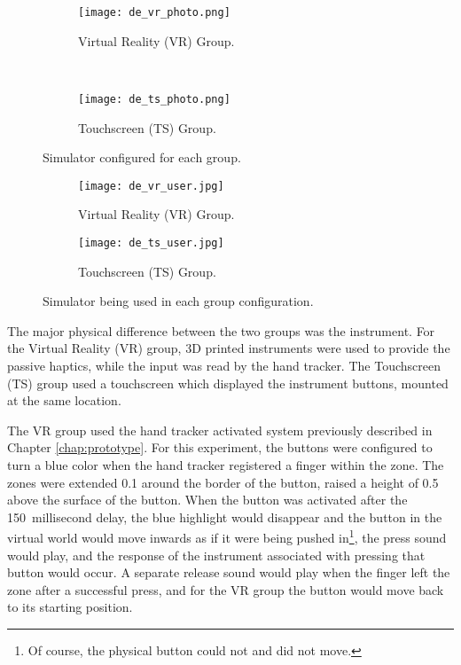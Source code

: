 \begin{figure}
    \centering
    \begin{subfigure}[t]{0.95\linewidth}
        \centering
        \texttt{[image: de\_vr\_photo.png]}
        \caption{Virtual Reality (VR) Group.}
        \label{fig:de_simgroups:vr}
    \end{subfigure}\\
    \begin{subfigure}[t]{0.95\linewidth}
        \centering
        \texttt{[image: de\_ts\_photo.png]}
        \caption{Touchscreen (TS) Group.}
        \label{fig:de_simgroups:ts}
    \end{subfigure}
    \caption{Simulator configured for each group.}
    \label{fig:de_simgroups}
\end{figure}

\begin{figure}
    \centering
    \begin{subfigure}[t]{0.95\linewidth}
        \centering
        \texttt{[image: de\_vr\_user.jpg]}
        \caption{Virtual Reality (VR) Group.}
        \label{fig:de_userpic:vr}
    \end{subfigure}
    \begin{subfigure}[t]{0.95\linewidth}
        \centering
        \texttt{[image: de\_ts\_user.jpg]}
        \caption{Touchscreen (TS) Group.}
        \label{fig:de_userpic:ts}
    \end{subfigure}
    \caption{Simulator being used in each group configuration.}
    \label{fig:de_userpic}
\end{figure}

The major physical difference between the two groups was the instrument.
For the Virtual Reality (VR) group, 3D printed instruments were used to provide the passive haptics, while the input was read by the hand tracker.
The Touchscreen (TS) group used a touchscreen which displayed the instrument buttons, mounted at the same location.

The VR group used the hand tracker activated system previously described in Chapter \ref{chap:prototype}.
For this experiment, the buttons were configured to turn a blue color when the hand tracker registered a finger within the zone.
The zones were extended \SI{0.1}{\inch} around the border of the button, raised a height of \SI{0.5}{\inch} above the surface of the button.
When the button was activated after the 150~millisecond delay, the blue highlight would disappear and the button in the virtual world would move inwards as if it were being pushed in\footnote{Of course, the physical button could not and did not move.}, the press sound would play, and the response of the instrument associated with pressing that button would occur.
A separate release sound would play when the finger left the zone after a successful press, and for the VR group the button would move back to its starting position.


